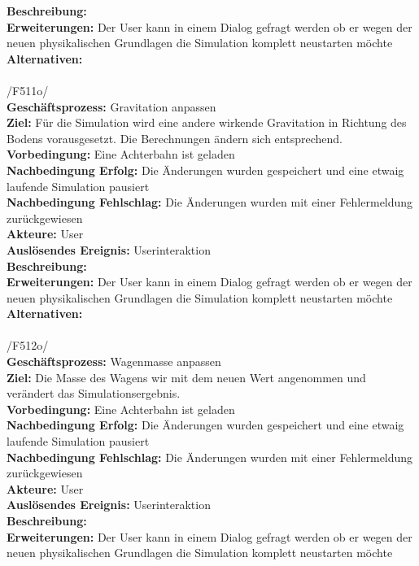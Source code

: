 \textbf{Beschreibung:} \\
\textbf{Erweiterungen:} Der User kann in einem Dialog gefragt werden ob er wegen der neuen physikalischen Grundlagen die Simulation komplett neustarten möchte\\
\textbf{Alternativen:}\\
\\
/F511o/\\
\textbf{Geschäftsprozess:} Gravitation anpassen\\
\textbf{Ziel:} Für die Simulation wird eine andere wirkende Gravitation in Richtung des Bodens vorausgesetzt. Die Berechnungen ändern sich entsprechend.\\
\textbf{Vorbedingung:} Eine Achterbahn ist geladen\\
\textbf{Nachbedingung Erfolg:} Die Änderungen wurden gespeichert und eine etwaig laufende Simulation pausiert\\
\textbf{Nachbedingung Fehlschlag:}  Die Änderungen wurden mit einer Fehlermeldung zurückgewiesen\\
\textbf{Akteure:} User\\
\textbf{Auslösendes Ereignis:} Userinteraktion\\
\textbf{Beschreibung:} \\
\textbf{Erweiterungen:} Der User kann in einem Dialog gefragt werden ob er wegen der neuen physikalischen Grundlagen die Simulation komplett neustarten möchte\\
\textbf{Alternativen:}\\
\\
/F512o/\\
\textbf{Geschäftsprozess:} Wagenmasse anpassen\\
\textbf{Ziel:} Die Masse des Wagens wir mit dem neuen Wert angenommen und verändert das Simulationsergebnis.\\
\textbf{Vorbedingung:} Eine Achterbahn ist geladen\\
\textbf{Nachbedingung Erfolg:} Die Änderungen wurden gespeichert und eine etwaig laufende Simulation pausiert\\
\textbf{Nachbedingung Fehlschlag:}  Die Änderungen wurden mit einer Fehlermeldung zurückgewiesen\\
\textbf{Akteure:} User\\
\textbf{Auslösendes Ereignis:} Userinteraktion\\
\textbf{Beschreibung:} \\
\textbf{Erweiterungen:} Der User kann in einem Dialog gefragt werden ob er wegen der neuen physikalischen Grundlagen die Simulation komplett neustarten möchte\\
